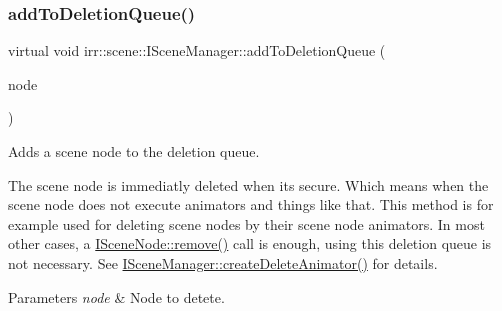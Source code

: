 \subsubsection{\texorpdfstring{add\+To\+Deletion\+Queue()}{addToDeletionQueue()}}
{\footnotesize\ttfamily virtual void irr\+::scene\+::\+I\+Scene\+Manager\+::add\+To\+Deletion\+Queue (\begin{DoxyParamCaption}\item[{\hyperlink{classirr_1_1scene_1_1ISceneNode}{I\+Scene\+Node} $\ast$}]{node }\end{DoxyParamCaption})\hspace{0.3cm}{\ttfamily [pure virtual]}}



Adds a scene node to the deletion queue. 

The scene node is immediatly deleted when it\textquotesingle{}s secure. Which means when the scene node does not execute animators and things like that. This method is for example used for deleting scene nodes by their scene node animators. In most other cases, a \hyperlink{classirr_1_1scene_1_1ISceneNode_a2efa2670e29d6bb33b0dd99403b8b69c}{I\+Scene\+Node\+::remove()} call is enough, using this deletion queue is not necessary. See \hyperlink{classirr_1_1scene_1_1ISceneManager_a163cc04ff2cb03852ac891de56200fa3}{I\+Scene\+Manager\+::create\+Delete\+Animator()} for details. 
\begin{DoxyParams}{Parameters}
{\em node} & Node to detete. \\
\hline
\end{DoxyParams}
\mbox{\label{classirr_1_1scene_1_1ISceneManager_a7086c554b86bdf055d6ebcc5950e1f16}} 
